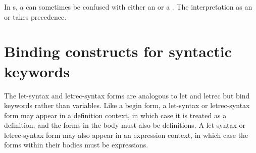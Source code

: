 \begin{entry}{%
}
In s, a  can sometimes
be confused with either an  or a .  The interpretation as an
 or  takes precedence.

\end{entry}

\section{Binding constructs for syntactic keywords}
\label{bindsyntax}

The {\cf let-syntax} and {\cf letrec-syntax} forms are analogous to {\cf let}
and {\cf letrec} but bind keywords rather than variables.
Like a {\cf begin} form, a {\cf let-syntax} or {\cf letrec-syntax} form
may appear in a definition context, in which case it is treated as a
definition, and the forms in the body must also be
definitions.
A {\cf let-syntax} or {\cf letrec-syntax} form may also appear in an
expression context, in which case the forms within their bodies must be
expressions.

